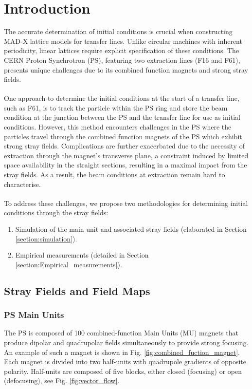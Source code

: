 \section{Introduction}

The accurate determination of initial conditions is crucial when constructing MAD-X lattice models for transfer lines. Unlike circular machines with inherent periodicity, linear lattices require explicit specification of these conditions. The CERN Proton Synchrotron (PS), featuring two extraction lines (F16 and F61), presents unique challenges due to its combined function magnets and strong stray fields.
\\
\\
One approach to determine the initial conditions at the start of a transfer line, such as F61, is to track the particle within the PS ring and store the beam condition at the junction between the PS and the transfer line for use as initial conditions. However, this method encounters challenges in the PS where the particles travel through the combined function magnets of the PS which exhibit strong stray fields. Complications are further exacerbated due to the necessity of extraction through the magnet's transverse plane, a constraint induced by limited space availability in the straight sections, resulting in a maximal impact from the stray fields. As a result, the beam conditions at extraction remain hard to characterise.
\\
\\
To address these challenges, we propose two methodologies for determining initial conditions through the stray fields:
\begin{enumerate}
    \item{Simulation of the main unit and associated stray fields (elaborated in Section \ref{section:simulation}).}
    \item{Empirical measurements (detailed in Section \ref{section:Empirical_measurements}).}
\end{enumerate}


\subsection{Stray Fields and Field Maps}
\subsubsection{PS Main Units}

The PS is composed of 100 combined-function Main Units (MU) magnets that produce dipolar and quadrupolar fields simultaneously to provide strong focusing. An example of such a magnet is shown in Fig. \ref{fig:combined_fuction_magnet}. Each magnet is divided into two half-units with quadrupole gradients of opposite polarity. Half-units are composed of five blocks, either closed (focusing) or open (defocusing), see Fig. \ref{fig:vector_flow}.
\\

